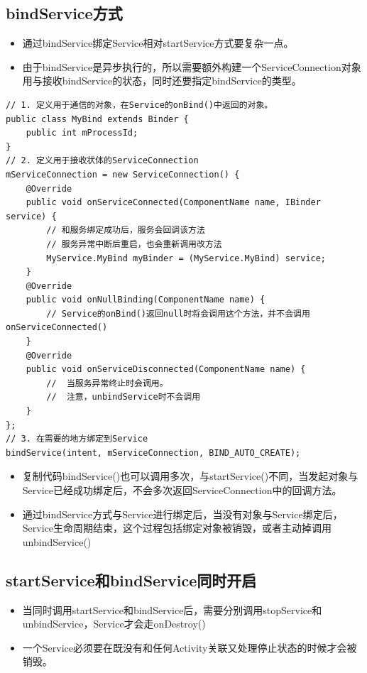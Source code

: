 \documentclass[9pt, b5paper]{article}
\begin{document}
\subsection{bindService方式}
\label{sec-1-3}
\begin{itemize}
\item 通过bindService绑定Service相对startService方式要复杂一点。
\item 由于bindService是异步执行的，所以需要额外构建一个ServiceConnection对象用与接收bindService的状态，同时还要指定bindService的类型。
\end{itemize}
\begin{verbatim}
// 1. 定义用于通信的对象，在Service的onBind()中返回的对象。
public class MyBind extends Binder {
    public int mProcessId;
}
// 2. 定义用于接收状体的ServiceConnection
mServiceConnection = new ServiceConnection() {
    @Override
    public void onServiceConnected(ComponentName name, IBinder service) {
        // 和服务绑定成功后，服务会回调该方法
        // 服务异常中断后重启，也会重新调用改方法
        MyService.MyBind myBinder = (MyService.MyBind) service;
    }
    @Override
    public void onNullBinding(ComponentName name) {
        // Service的onBind()返回null时将会调用这个方法，并不会调用onServiceConnected()
    }
    @Override
    public void onServiceDisconnected(ComponentName name) {
        //  当服务异常终止时会调用。
        //  注意，unbindService时不会调用
    }
};
// 3. 在需要的地方绑定到Service
bindService(intent, mServiceConnection, BIND_AUTO_CREATE);
\end{verbatim}
\begin{itemize}
\item 复制代码bindService()也可以调用多次，与startService()不同，当发起对象与Service已经成功绑定后，不会多次返回ServiceConnection中的回调方法。
\item 通过bindService方式与Service进行绑定后，当没有对象与Service绑定后，Service生命周期结束，这个过程包括绑定对象被销毁，或者主动掉调用unbindService()
\end{itemize}
\subsection{startService和bindService同时开启}
\label{sec-1-4}
\begin{itemize}
\item 当同时调用startService和bindService后，需要分别调用stopService和unbindService，Service才会走onDestroy()
\item 一个Service必须要在既没有和任何Activity关联又处理停止状态的时候才会被销毁。
\end{itemize}
\end{document}
